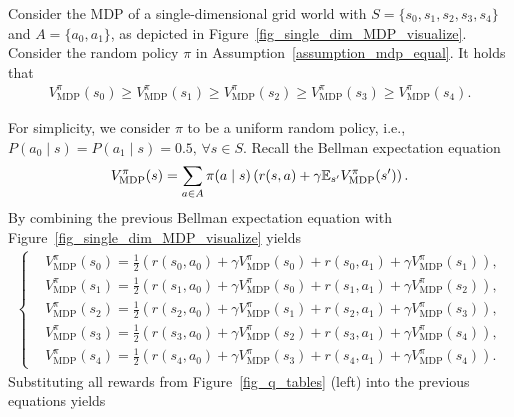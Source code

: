 \begin{lemma}\label{lemma_v_monotonic}
    Consider the MDP of a single-dimensional grid world with $S=\{s_0, s_1, s_2, s_3, s_4\}$ and $A=\{a_0, a_1\}$, as depicted in Figure~\ref{fig_single_dim_MDP_visualize}. Consider the random policy $\pi$ in Assumption~\ref{assumption_mdp_equal}. It holds that
    \begin{align}
        V_\text{MDP}^{\pi}(s_0) \geq V_\text{MDP}^{\pi}(s_1) \geq V_\text{MDP}^{\pi}(s_2) \geq V_\text{MDP}^{\pi}(s_3) \geq V_\text{MDP}^{\pi}(s_4).
    \end{align}
\end{lemma}
%
\begin{myproof}
    For simplicity, we consider $\pi$ to be a uniform random policy, i.e., $P(a_0 \mid s) = P(a_1 \mid s) = 0.5, \, \forall s \in S.$
    Recall the Bellman expectation equation
    \begin{align}
        V_\text{MDP}^{\pi}(s) = \sum_{a \in A} \pi(a \mid s) \left( r(s, a) + \gamma {\ensuremath{\mathbb E}}_{s'} V_\text{MDP}^{\pi}(s') \right).
    \end{align}
    By combining the previous Bellman expectation equation with Figure~\ref{fig_single_dim_MDP_visualize} yields
    \begin{align}
    \begin{cases}
    &\!\!\!\!\!\! V_\text{MDP}^{\pi}(s_0) = \frac{1}{2} \left(r(s_0, a_0) + \gamma V_\text{MDP}^{\pi}(s_0) + r(s_0, a_1) + \gamma V_\text{MDP}^{\pi}(s_1) \right),  \\
    &\!\!\!\!\!\! V_\text{MDP}^{\pi}(s_1) = \frac{1}{2} \left(r(s_1, a_0) + \gamma V_\text{MDP}^{\pi}(s_0) + r(s_1, a_1) + \gamma V_\text{MDP}^{\pi}(s_2) \right),  \\
    &\!\!\!\!\!\! V_\text{MDP}^{\pi}(s_2) = \frac{1}{2} \left(r(s_2, a_0) + \gamma V_\text{MDP}^{\pi}(s_1) + r(s_2, a_1) + \gamma V_\text{MDP}^{\pi}(s_3) \right),  \\
    &\!\!\!\!\!\! V_\text{MDP}^{\pi}(s_3) = \frac{1}{2} \left(r(s_3, a_0) + \gamma V_\text{MDP}^{\pi}(s_2) + r(s_3, a_1) + \gamma V_\text{MDP}^{\pi}(s_4) \right),  \\
    &\!\!\!\!\!\! V_\text{MDP}^{\pi}(s_4) = \frac{1}{2} \left(r(s_4, a_0) + \gamma V_\text{MDP}^{\pi}(s_3) + r(s_4, a_1) + \gamma V_\text{MDP}^{\pi}(s_4) \right).
    \end{cases}
    \end{align}
    Substituting all rewards from Figure~\ref{fig_q_tables} (left) into the previous equations yields
    \begin{align}\label{eqn_lemma1}

\end{align}
\end{myproof}
